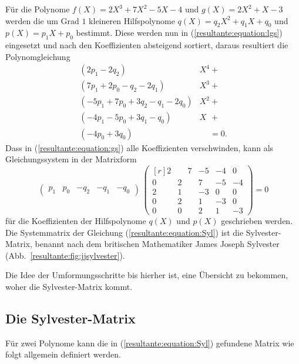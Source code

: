 \begin{beispiel}
    Für die Polynome \(f(X)=2X^3+7X^2-5X-4\) und \(g(X)=2X^2+X-3\) werden
    die um Grad \(1\) kleineren Hilfspolynome \(q(X)=q_2X^2+q_1X+q_0\)
    und \(p(X)=p_1X+p_0\) bestimmt.
    Diese werden nun in (\ref{resultante:equation:lgs}) eingesetzt und
    nach den Koeffizienten absteigend sortiert, daraus resultiert die
    Polynomgleichung
    \begin{equation}
        \begin{aligned}
            (2p_1-2q_2)& X^4+\\
            (7p_1+2p_0-q_2-2q_1)& X^3+\\
            (-5p_1+7p_0+3q_2-q_1-2q_0)& X^2+\\
            (-4p_1-5p_0+3q_1-q_0)& X^{\phantom{0}}+\\
            (-4p_0+3q_0)& \phantom{X^0}=0.
        \end{aligned}
        \label{resultante:equation:gs}
    \end{equation}
    Dass in (\ref{resultante:equation:gs}) alle Koeffizienten
    verschwinden, kann als Gleichungssystem in der Matrixform
    \begin{equation}
        \begin{pmatrix}
            p_1&p_0&-q_2&-q_1&-q_0
        \end{pmatrix}
        \,
        \begin{pmatrix*}[r]
            2 &\phantom{-}7 & -5 & -4 &  0 \\
            0 &           2 &  7 & -5 & -4 \\
            2 &           1 & -3 &  0 &  0 \\
            0 &           2 &  1 & -3 &  0 \\
            0 &           0 &  2 &  1 & -3
        \end{pmatrix*}=0
        \label{resultante:equation:Syl}
    \end{equation}
    für die Koeffizienten der Hilfspolynome \(q(X)\) und
    \(p(X)\) geschrieben werden. Die Systemmatrix der Gleichung
    (\ref{resultante:equation:Syl}) ist die Sylvester-Matrix,
    benannt nach dem britischen Mathematiker James Joseph Sylvester
    (Abb.~\ref{resultante:fig:jjsylvester}).
    \label{resultante:beispiel:lgs}
\end{beispiel}
Die Idee der Umformungsschritte bis hierher ist, eine Übersicht zu
bekommen, woher die Sylvester-Matrix kommt.

\subsection{Die Sylvester-Matrix
\label{resultante:subsection:Sylvester-Matrix}}
Für zwei Polynome kann die in (\ref{resultante:equation:Syl}) gefundene
Matrix wie folgt allgemein definiert werden.


